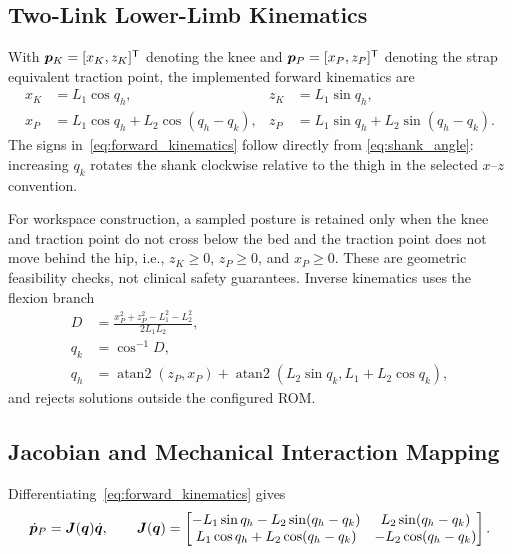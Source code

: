 \subsection{Two-Link Lower-Limb Kinematics}
\label{subsec:kinematics}

With $\bm{p}_K=[x_K,z_K]^{\mathsf T}$ denoting the knee and
$\bm{p}_P=[x_P,z_P]^{\mathsf T}$ denoting the strap equivalent traction point,
the implemented forward kinematics are
\begin{align}
    x_K &= L_1\cos q_h, & z_K &= L_1\sin q_h, \nonumber\\
    x_P &= L_1\cos q_h+L_2\cos(q_h-q_k),
    & z_P &= L_1\sin q_h+L_2\sin(q_h-q_k).
    \label{eq:forward_kinematics}
\end{align}
The signs in~\eqref{eq:forward_kinematics} follow directly from
\eqref{eq:shank_angle}: increasing $q_k$ rotates the shank clockwise relative
to the thigh in the selected $x$--$z$ convention.

For workspace construction, a sampled posture is retained only when the knee
and traction point do not cross below the bed and the traction point does not
move behind the hip, i.e., $z_K\geq 0$, $z_P\geq 0$, and $x_P\geq 0$.  These are
geometric feasibility checks, not clinical safety guarantees.  Inverse
kinematics uses the flexion branch
\begin{align}
    D &= \frac{x_P^2+z_P^2-L_1^2-L_2^2}{2L_1L_2}, \nonumber\\
    q_k &= \cos^{-1}D, \nonumber\\
    q_h &= \operatorname{atan2}(z_P,x_P)
      +\operatorname{atan2}\!\left(L_2\sin q_k,L_1+L_2\cos q_k\right),
    \label{eq:inverse_kinematics}
\end{align}
and rejects solutions outside the configured ROM.

\subsection{Jacobian and Mechanical Interaction Mapping}
\label{subsec:jacobian}

Differentiating~\eqref{eq:forward_kinematics} gives
\begin{equation}
    \dot{\bm{p}}_P=\bm{J}(\bm{q})\dot{\bm{q}},
    \qquad
    \bm{J}(\bm{q})=
    \begin{bmatrix}
    -L_1\sin q_h-L_2\sin(q_h-q_k) & L_2\sin(q_h-q_k)\\
     L_1\cos q_h+L_2\cos(q_h-q_k) & -L_2\cos(q_h-q_k)
    \end{bmatrix}.
    \label{eq:jacobian}
\end{equation}

